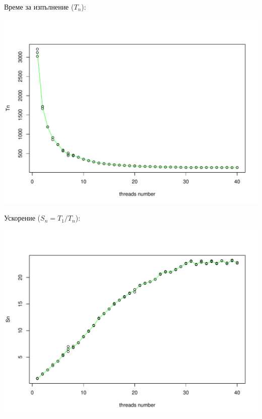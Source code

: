 \documentclass[12pt]{extarticle}
\begin{document}
\vspace{5mm}
Време за изпълнение ($T_n$):
\begin{center}
\includegraphics[width=\textwidth]{thread_graphs/Tn.pdf}
\end{center}

Ускорение ($S_n = T_1 / T_n$):
\begin{center}
\includegraphics[width=\textwidth]{thread_graphs/Sn.pdf}
\end{center}
\end{document}
